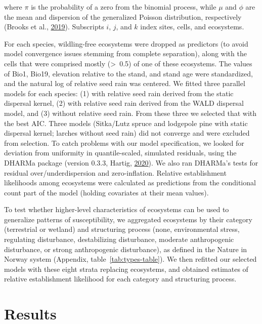 \documentclass[
]{article}
\begin{document}
where \(\pi\) is the probability of a zero from the binomial process, while \(\mu\) and \(\phi\) are the mean and dispersion of the generalized Poisson distribution, respectively (Brooks et al., \protect\hyperlink{ref-brooksStatisticalModelingPatterns2019}{2019}).
Subscripts \(i\), \(j\), and \(k\) index sites, cells, and ecosystems.

For each species, wildling-free ecosystems were dropped as predictors (to avoid model convergence issues stemming from complete separation), along with the cells that were comprised mostly (\textgreater~0.5) of one of these ecosystems.
The values of Bio1, Bio19, elevation relative to the stand, and stand age were standardized, and the natural log of relative seed rain was centered.
We fitted three parallel models for each species: (1) with relative seed rain derived from the static dispersal kernel, (2) with relative seed rain derived from the WALD dispersal model, and (3) without relative seed rain.
From these three we selected that with the best AIC.
Three models (Sitka/Lutz spruce and lodgepole pine with static dispersal kernel; larches without seed rain) did not converge and were excluded from selection.
To catch problems with our model specification, we looked for deviation from uniformity in quantile-scaled, simulated residuals, using the DHARMa package (version 0.3.3, Hartig, \protect\hyperlink{ref-hartigDHARMaResidualDiagnostics2020}{2020}).
We also ran DHARMa's tests for residual over/underdispersion and zero-inflation.
Relative establishment likelihoods among ecosystems were calculated as predictions from the conditional count part of the model (holding covariates at their mean values).

To test whether higher-level characteristics of ecosystems can be used to generalize patterns of susceptibility, we aggregated ecosystems by their category (terrestrial or wetland) and structuring process (none, environmental stress, regulating disturbance, destabilizing disturbance, moderate anthropogenic disturbance, or strong anthropogenic disturbance), as defined in the Nature in Norway system (Appendix, table~\ref{tab:types-table}).
We then refitted our selected models with these eight strata replacing ecosystems, and obtained estimates of relative establishment likelihood for each category and structuring process.

\hypertarget{results}{%
\section{Results}\label{results}}
\end{document}
